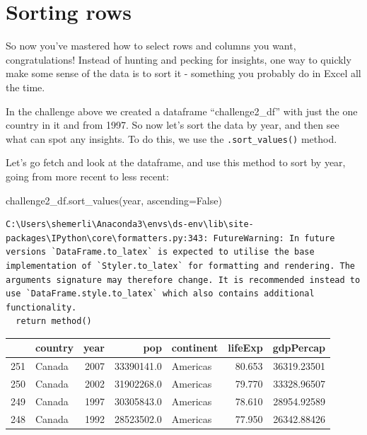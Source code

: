 \documentclass[
  letterpaper,
  DIV=11,
  numbers=noendperiod]{scrreprt}
\newenvironment{Shaded}{\begin{snugshade}}{\end{snugshade}}
\newcommand{\NormalTok}[1]{\textcolor[rgb]{0.00,0.23,0.31}{#1}}
\newcommand{\OperatorTok}[1]{\textcolor[rgb]{0.37,0.37,0.37}{#1}}
\newcommand{\StringTok}[1]{\textcolor[rgb]{0.13,0.47,0.30}{#1}}
\newcommand{\VariableTok}[1]{\textcolor[rgb]{0.07,0.07,0.07}{#1}}
\begin{document}
\hypertarget{sorting-rows}{%
\section{Sorting rows}\label{sorting-rows}}

So now you've mastered how to select rows and columns you want,
congratulations! Instead of hunting and pecking for insights, one way to
quickly make some sense of the data is to sort it - something you
probably do in Excel all the time.

In the challenge above we created a dataframe ``challenge2\_df'' with
just the one country in it and from 1997. So now let's sort the data by
year, and then see what can spot any insights. To do this, we use the
\texttt{.sort\_values()} method.

Let's go fetch and look at the dataframe, and use this method to sort by
year, going from more recent to less recent:

\begin{Shaded}
\begin{Highlighting}[]
\NormalTok{challenge2\_df.sort\_values(}\StringTok{\textquotesingle{}year\textquotesingle{}}\NormalTok{, ascending}\OperatorTok{=}\VariableTok{False}\NormalTok{)}
\end{Highlighting}
\end{Shaded}

\begin{verbatim}
C:\Users\shemerli\Anaconda3\envs\ds-env\lib\site-packages\IPython\core\formatters.py:343: FutureWarning: In future versions `DataFrame.to_latex` is expected to utilise the base implementation of `Styler.to_latex` for formatting and rendering. The arguments signature may therefore change. It is recommended instead to use `DataFrame.style.to_latex` which also contains additional functionality.
  return method()
\end{verbatim}

\begin{tabular}{llrrlrr}
\toprule
{} & country &  year &         pop & continent &  lifeExp &    gdpPercap \\
\midrule
251 &  Canada &  2007 &  33390141.0 &  Americas &   80.653 &  36319.23501 \\
250 &  Canada &  2002 &  31902268.0 &  Americas &   79.770 &  33328.96507 \\
249 &  Canada &  1997 &  30305843.0 &  Americas &   78.610 &  28954.92589 \\
248 &  Canada &  1992 &  28523502.0 &  Americas &   77.950 &  26342.88426 \\
\bottomrule
\end{tabular}
\end{document}
